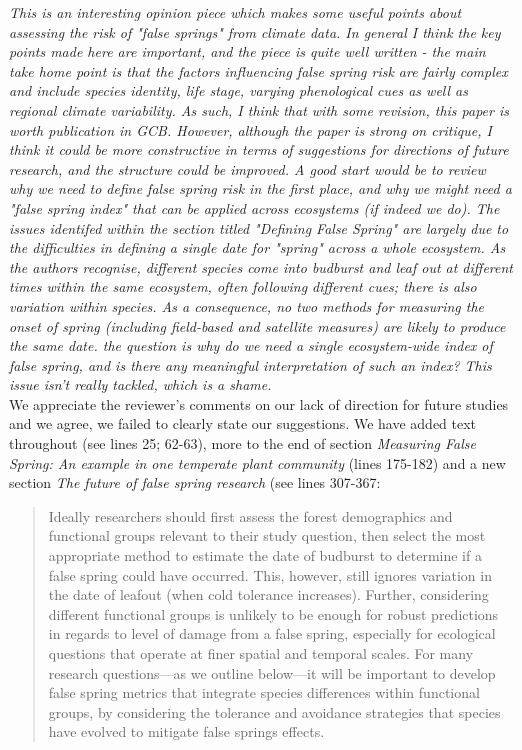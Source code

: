 \documentclass[11pt,a4paper]{article}
\begin{document}
\textit{This is an interesting opinion piece which makes some useful points about assessing the risk of "false springs" from climate data.  In general I think the key points made here are important, and the piece is quite well written - the main take home point is that the factors influencing false spring risk are fairly complex and include species identity, life stage, varying phenological cues as well as regional climate variability.  As such, I think that with some revision, this paper is worth publication in GCB. However, although the paper is strong on critique, I think it could be more constructive in terms of suggestions for directions of future research, and the structure could be improved.  A good start would be to review why we need to define false spring risk in the first place, and why we might need a "false spring index" that can be applied across ecosystems (if indeed we do).  The issues identifed within the section titled "Defining False Spring" are largely due to the difficulties in defining a single date for "spring" across a whole ecosystem.  As the authors recognise, different species come into budburst and leaf out at different times within the same ecosystem, often following different cues; there is also variation within species.  As a consequence, no two methods for measuring the onset of spring (including field-based and satellite measures) are likely to produce the same date.  the question is why do we need a single ecosystem-wide index of false spring, and is there any meaningful interpretation of such an index?  This issue isn't really tackled, which is a shame. } \\

We appreciate the reviewer's comments on our lack of direction for future studies and we agree, we failed to clearly state our suggestions. We have added text throughout (see lines 25; 62-63),  more to the end of section \textit{Measuring False Spring: An example in one temperate plant community} (lines 175-182) and a new section \textit{The future of false spring research} (see lines 307-367: \\ 

\begin{quotation}
Ideally researchers should first assess the forest demographics and functional groups relevant to their study question, then select the most appropriate method to estimate the date of budburst to determine if a false spring could have occurred. This, however, still ignores variation in the date of leafout (when cold tolerance increases). Further, considering different functional groups is unlikely to be enough for robust predictions in regards to level of damage from a false spring, especially for ecological questions that operate at finer spatial and temporal scales. For many research questions---as we outline below---it will be important to develop false spring metrics that integrate species differences within functional groups, by considering the tolerance and avoidance strategies that species have evolved to mitigate false springs effects.
\end{quotation} 
\end{document}
